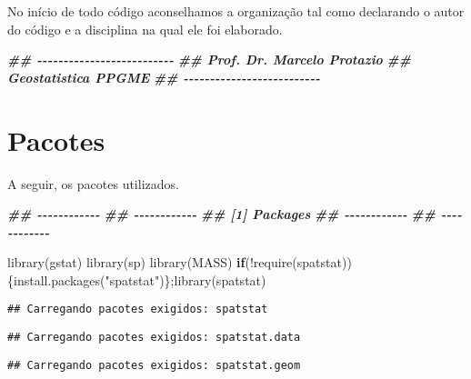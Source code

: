 \documentclass[
]{book}
\newenvironment{Shaded}{\begin{snugshade}}{\end{snugshade}}
\newcommand{\ControlFlowTok}[1]{\textcolor[rgb]{0.13,0.29,0.53}{\textbf{#1}}}
\newcommand{\DocumentationTok}[1]{\textcolor[rgb]{0.56,0.35,0.01}{\textbf{\textit{#1}}}}
\newcommand{\FunctionTok}[1]{\textcolor[rgb]{0.00,0.00,0.00}{#1}}
\newcommand{\NormalTok}[1]{#1}
\newcommand{\SpecialCharTok}[1]{\textcolor[rgb]{0.00,0.00,0.00}{#1}}
\newcommand{\StringTok}[1]{\textcolor[rgb]{0.31,0.60,0.02}{#1}}
\theoremstyle{definition}
\theoremstyle{definition}
\theoremstyle{definition}
\theoremstyle{definition}
\theoremstyle{remark}
\begin{document}
No início de todo código aconselhamos a organização tal como declarando o autor do código e a disciplina na qual ele foi elaborado.

\begin{Shaded}
\begin{Highlighting}[]
\DocumentationTok{\#\# {-}{-}{-}{-}{-}{-}{-}{-}{-}{-}{-}{-}{-}{-}{-}{-}{-}{-}{-}{-}{-}{-}{-}{-}{-}{-}}
\DocumentationTok{\#\# Prof. Dr. Marcelo Protazio}
\DocumentationTok{\#\# Geostatistica PPGME}
\DocumentationTok{\#\# {-}{-}{-}{-}{-}{-}{-}{-}{-}{-}{-}{-}{-}{-}{-}{-}{-}{-}{-}{-}{-}{-}{-}{-}{-}{-}}
\end{Highlighting}
\end{Shaded}

\hypertarget{pacotes}{%
\section{Pacotes}\label{pacotes}}

A seguir, os pacotes utilizados.

\begin{Shaded}
\begin{Highlighting}[]
\DocumentationTok{\#\# {-}{-}{-}{-}{-}{-}{-}{-}{-}{-}{-}{-}}
\DocumentationTok{\#\# {-}{-}{-}{-}{-}{-}{-}{-}{-}{-}{-}{-}}
\DocumentationTok{\#\# [1] Packages}
\DocumentationTok{\#\# {-}{-}{-}{-}{-}{-}{-}{-}{-}{-}{-}{-}}
\DocumentationTok{\#\# {-}{-}{-}{-}{-}{-}{-}{-}{-}{-}{-}{-}}

\FunctionTok{library}\NormalTok{(gstat)}
\FunctionTok{library}\NormalTok{(sp)}
\FunctionTok{library}\NormalTok{(MASS)}
\ControlFlowTok{if}\NormalTok{(}\SpecialCharTok{!}\FunctionTok{require}\NormalTok{(spatstat))\{}\FunctionTok{install.packages}\NormalTok{(}\StringTok{"spatstat"}\NormalTok{)\};}\FunctionTok{library}\NormalTok{(spatstat)}
\end{Highlighting}
\end{Shaded}

\begin{verbatim}
## Carregando pacotes exigidos: spatstat
\end{verbatim}

\begin{verbatim}
## Carregando pacotes exigidos: spatstat.data
\end{verbatim}

\begin{verbatim}
## Carregando pacotes exigidos: spatstat.geom
\end{verbatim}
\end{document}
